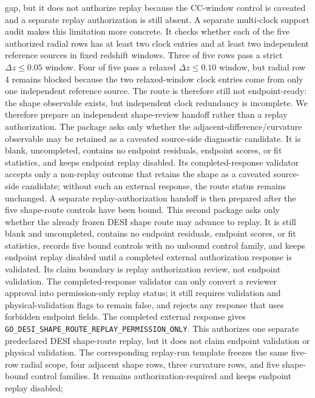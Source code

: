 \documentclass[11pt]{article}
\begin{document}
gap, but it does not authorize replay because the CC-window control is
caveated and a separate replay authorization is still absent.
A separate multi-clock support audit makes this limitation more concrete.  It
checks whether each of the five authorized radial rows has at least two clock
entries and at least two independent reference sources in fixed redshift
windows.  Three of five rows pass a strict \(\Delta z\le 0.05\) window. Four of
five pass a relaxed \(\Delta z\le 0.10\) window, but radial row 4 remains
blocked because the two relaxed-window clock entries come from only one
independent reference source.  The route is therefore still not endpoint-ready:
the shape observable exists, but independent clock redundancy is incomplete.
We therefore prepare an independent shape-review handoff rather than a replay
authorization.  The package asks only whether the adjacent-difference/curvature
observable may be retained as a caveated source-side diagnostic candidate. It is
blank, uncompleted, contains no endpoint residuals, endpoint scores, or fit
statistics, and keeps endpoint replay disabled.
Its completed-response validator accepts only a non-replay outcome that retains
the shape as a caveated source-side candidate; without such an external response,
the route status remains unchanged.
A separate replay-authorization handoff is then prepared after the five
shape-route controls have been bound.  This second package asks only whether
the already frozen DESI shape route may advance to replay. It is still blank
and uncompleted, contains no endpoint residuals, endpoint scores, or fit
statistics, records five bound controls with no unbound control family, and
keeps endpoint replay disabled until a completed external authorization response
is validated.  Its claim boundary is replay authorization review, not endpoint
validation.  The completed-response validator can only convert a reviewer
approval into permission-only replay status; it still requires validation and
physical-validation flags to remain false, and rejects any response that uses
forbidden endpoint fields.
The completed external response gives
\texttt{GO\_\allowbreak{}DESI\_\allowbreak{}SHAPE\_\allowbreak{}ROUTE\_\allowbreak{}REPLAY\_\allowbreak{}PERMISSION\_\allowbreak{}ONLY}. This authorizes
one separate predeclared DESI shape-route replay, but it does not claim endpoint
validation or physical validation.
The corresponding replay-run template freezes the same five-row radial scope,
four adjacent shape rows, three curvature rows, and five shape-bound control
families. It remains authorization-required and keeps endpoint replay disabled;
\end{document}
